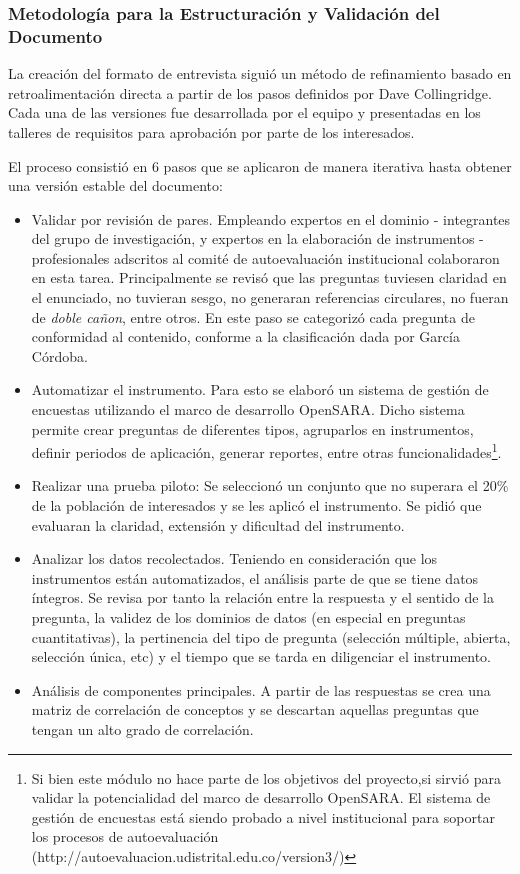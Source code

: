 \subsubsection{Metodología para la Estructuración y Validación del Documento}

La creación del formato de entrevista siguió un método de refinamiento basado en retroalimentación directa a partir de los pasos definidos por Dave Collingridge\cite{zellerino2009}. Cada una de las versiones fue desarrollada por el equipo y presentadas en los talleres de requisitos para aprobación por parte de los interesados.

El proceso consistió en 6 pasos que se aplicaron de manera iterativa hasta obtener una versión estable del documento:

\begin{itemize}
 \item Validar por revisión de pares. Empleando expertos en el dominio - integrantes del grupo de investigación, y expertos en la elaboración de instrumentos - profesionales adscritos al comité de autoevaluación institucional colaboraron en esta tarea. Principalmente se revisó que las preguntas tuviesen claridad en el enunciado, no tuvieran sesgo, no generaran referencias circulares, no fueran de \textit{doble cañon}, entre otros. En este paso se categorizó cada pregunta de conformidad al contenido, conforme a la clasificación dada por García Córdoba\cite{garcia2008}.
 \item Automatizar el instrumento. Para esto se elaboró un sistema de gestión de encuestas utilizando el marco de desarrollo OpenSARA. Dicho sistema permite crear preguntas de diferentes tipos, agruparlos en instrumentos, definir periodos de aplicación, generar reportes, entre otras funcionalidades\footnote{Si bien este módulo no hace parte de los objetivos del proyecto,si sirvió para validar la potencialidad del marco de desarrollo OpenSARA. El sistema de gestión de encuestas está siendo probado a nivel institucional para soportar los procesos de autoevaluación (http://autoevaluacion.udistrital.edu.co/version3/)}. 
 \item Realizar una prueba piloto: Se seleccionó un conjunto que no superara el 20\% de la población de interesados y se les aplicó el instrumento. Se pidió que evaluaran la claridad, extensión y dificultad del instrumento.
 \item Analizar los datos recolectados. Teniendo en consideración que los instrumentos están automatizados, el análisis parte de que se tiene datos íntegros. Se revisa por tanto la relación entre la respuesta y el sentido de la pregunta, la validez de los dominios de datos (en especial en preguntas cuantitativas), la pertinencia del tipo de pregunta (selección múltiple, abierta, selección única, etc) y el tiempo que se tarda en diligenciar el instrumento.
 \item Análisis de componentes principales. A partir de las respuestas se crea una matriz de correlación de conceptos y se descartan aquellas preguntas que tengan un alto grado de correlación\cite{huang2011}. 
\end{itemize}

